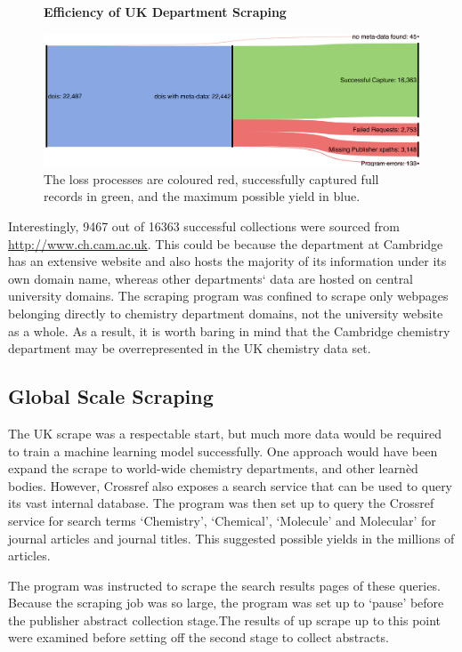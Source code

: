 \begin{figure}[H]
    \centering
    \textbf{Efficiency of UK Department Scraping}\par\medskip
    \includegraphics[scale=0.07]{Data_Acquisition/uk_sankey.png}
    \caption[Efficiency of UK Department Scraping]{The loss processes are coloured red, successfully captured full records in green, and the maximum possible yield in blue.}
     \label{fig:UKSANK}
\end{figure}

Interestingly, 9467 out of 16363 successful collections were sourced from \url{http://www.ch.cam.ac.uk}. This could be because the department at Cambridge has an extensive website and also hosts the majority of its information under its own domain name, whereas other departments` data are hosted on central university domains. The scraping program was confined to scrape only webpages belonging directly to chemistry department domains, not the university website as a whole. As a result, it is worth baring in mind that the Cambridge chemistry department may be overrepresented in the UK chemistry data set.

\subsection{Global Scale Scraping}
\label{sec:CROSSREFSCRAPE}
The UK scrape was a respectable start, but much more data would be required to train a machine learning model successfully. One approach would have been expand the scrape to world-wide chemistry departments, and other learn\`{e}d bodies. However, Crossref also exposes a search service that can be used to query its vast internal database. The program was then set up to query the Crossref service for search terms `Chemistry', `Chemical', `Molecule' and Molecular' for journal articles and journal titles. This suggested possible yields in the millions of articles. 

The program was instructed to scrape the search results pages of these queries. Because the scraping job was so large, the program was set up to `pause' before the publisher abstract collection stage.The results of up scrape up to this point were examined before setting off the second stage to collect abstracts.

